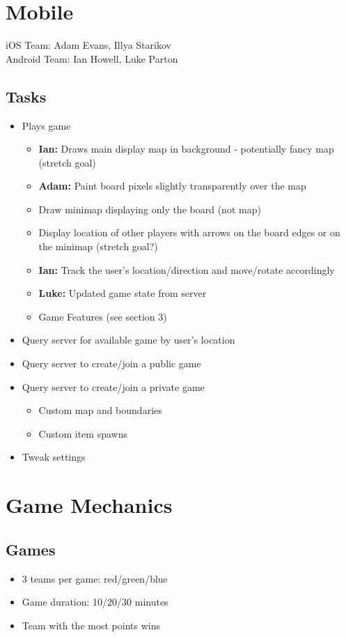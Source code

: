 \documentclass{article}
\begin{document}
\newpage
\section{Mobile}
iOS Team: Adam Evans, Illya Starikov\\
Android Team: Ian Howell, Luke Parton
\subsection{Tasks}
\begin{itemize}
  \item Plays game
    \begin{itemize}
      \item \textbf{Ian:} Draws main display map in background - potentially fancy map (stretch goal)
      \item \textbf{Adam:} Paint board pixels slightly transparently over the map
      \item Draw minimap displaying only the board (not map)
      \item Display location of other players with arrows on the board edges or on the minimap (stretch goal?)
      \item \textbf{Ian:} Track the user's location/direction and move/rotate accordingly
      \item \textbf{Luke:} Updated game state from server
      \item Game Features (see section 3)
    \end{itemize}
  \item Query server for available game by user's location
  \item Query server to create/join a public game
  \item Query server to create/join a private game
    \begin{itemize}
      \item Custom map and boundaries
      \item Custom item spawns
    \end{itemize}
  \item Tweak settings
\end{itemize}

\newpage
\section{Game Mechanics}

\subsection{Games}
\begin{itemize}
\item 3 teams per game: red/green/blue
\item Game duration: 10/20/30 minutes
\item Team with the most points wins
\end{itemize}
\end{document}
